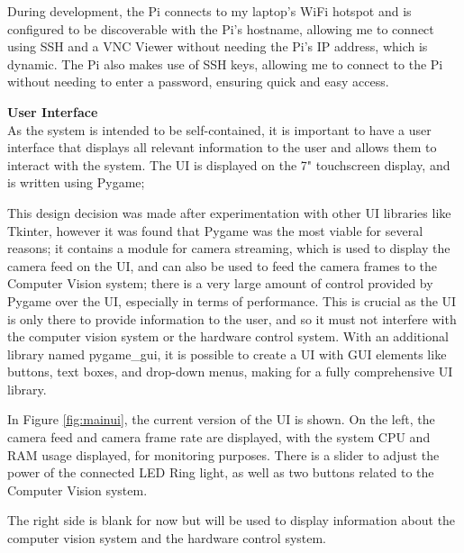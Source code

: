 During development, the Pi connects to my laptop's WiFi hotspot and is configured to be discoverable with the Pi's hostname, allowing me to connect using
SSH and a VNC Viewer without needing the Pi's IP address, which is dynamic. The Pi also makes use of SSH keys, allowing me to connect
to the Pi without needing to enter a password, ensuring quick and easy access.

\noindent
\textbf{User Interface} \\
As the system is intended to be self-contained, it is important to have a user interface that displays all relevant information to the user
and allows them to interact with the system. The UI is displayed on the 7" touchscreen display, and is written using Pygame\cite{pygamedoc};

This design decision was made after experimentation with other UI libraries like Tkinter\cite{tkinterdoc}, however it was found that Pygame was the most
viable for several reasons; it contains a module for camera streaming, which is used to display the camera feed on the UI, and can also be used to
feed the camera frames to the Computer Vision system; there is a very large amount of control provided by Pygame over the UI, especially in terms of 
performance. This is crucial as the UI is only there to provide information to the user, and so it must not interfere with the
computer vision system or the hardware control system. With an additional library named pygame\_gui\cite{pygamegui}, it is possible to create a UI with 
GUI elements like buttons, text boxes, and drop-down menus, making for a fully comprehensive UI library.

In Figure \ref*{fig:mainui}, the current version of the UI is shown. On the left, the camera feed and camera frame rate are displayed, with the system
CPU and RAM usage displayed, for monitoring purposes. There is a slider to adjust the power of the connected LED Ring light, as well as two buttons
related to the Computer Vision system.

The right side is blank for now but will be used to display information about the computer vision system and the hardware control system.

